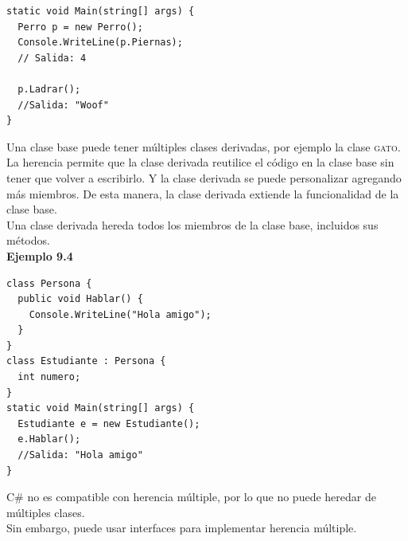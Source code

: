 \documentclass[12pt,a4paper]{report}
\begin{document}
\begin{lstlisting}
static void Main(string[] args) {
  Perro p = new Perro();
  Console.WriteLine(p.Piernas);
  // Salida: 4

  p.Ladrar();
  //Salida: "Woof"
}
\end{lstlisting}Una clase base puede tener múltiples clases derivadas, por ejemplo la clase \textsc{gato}.\\La herencia permite que la clase derivada reutilice el código en la clase base sin tener que volver a escribirlo. Y la clase derivada se puede personalizar agregando más miembros. De esta manera, la clase derivada extiende la funcionalidad de la clase base.\\Una clase derivada hereda todos los miembros de la clase base, incluidos sus métodos.\\\textbf{Ejemplo 9.4}
\begin{lstlisting}
class Persona {
  public void Hablar() {
    Console.WriteLine("Hola amigo");
  }
}
class Estudiante : Persona {
  int numero;
}
static void Main(string[] args) {
  Estudiante e = new Estudiante();
  e.Hablar();
  //Salida: "Hola amigo"
}
\end{lstlisting} C\# no es compatible con herencia múltiple, por lo que no puede heredar de múltiples clases.\\Sin embargo, puede usar interfaces para implementar herencia múltiple.
\end{document}
